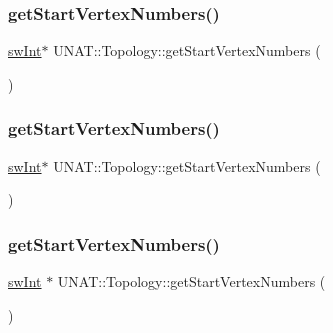 \subsubsection{\texorpdfstring{getStartVertexNumbers()}{getStartVertexNumbers()}\hspace{0.1cm}{\footnotesize\ttfamily [1/3]}}
{\footnotesize\ttfamily \mbox{\hyperlink{include_2swMacro_8h_a113cf5f6b5377cdf3fac6aa4e443e9aa}{sw\+Int}}$\ast$ U\+N\+A\+T\+::\+Topology\+::get\+Start\+Vertex\+Numbers (\begin{DoxyParamCaption}{ }\end{DoxyParamCaption})}

\mbox{\label{classUNAT_1_1Topology_aef52b7de5eb5124aaa4fa05ddbd6e736}} 
\subsubsection{\texorpdfstring{getStartVertexNumbers()}{getStartVertexNumbers()}\hspace{0.1cm}{\footnotesize\ttfamily [2/3]}}
{\footnotesize\ttfamily \mbox{\hyperlink{include_2swMacro_8h_a113cf5f6b5377cdf3fac6aa4e443e9aa}{sw\+Int}}$\ast$ U\+N\+A\+T\+::\+Topology\+::get\+Start\+Vertex\+Numbers (\begin{DoxyParamCaption}{ }\end{DoxyParamCaption})}

\mbox{\label{classUNAT_1_1Topology_a331046e1e8c64d3e579ff940855e6908}} 
\subsubsection{\texorpdfstring{getStartVertexNumbers()}{getStartVertexNumbers()}\hspace{0.1cm}{\footnotesize\ttfamily [3/3]}}
{\footnotesize\ttfamily \mbox{\hyperlink{include_2swMacro_8h_a113cf5f6b5377cdf3fac6aa4e443e9aa}{sw\+Int}} $\ast$ U\+N\+A\+T\+::\+Topology\+::get\+Start\+Vertex\+Numbers (\begin{DoxyParamCaption}{ }\end{DoxyParamCaption})}

